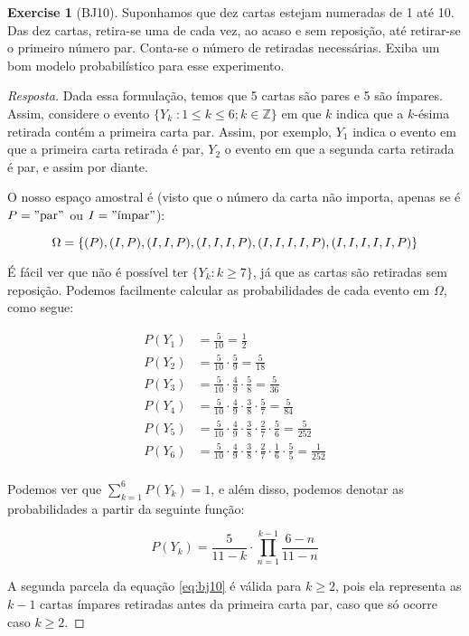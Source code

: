 \documentclass[
]{article}
\theoremstyle{definition}
\theoremstyle{definition}
\theoremstyle{definition}
\newtheorem{exercise}{Exercise}[section]
\theoremstyle{definition}
\theoremstyle{remark}
\begin{document}
\begin{exercise}[BJ10]

Suponhamos que dez cartas estejam numeradas de 1 até 10. Das dez cartas, retira-se uma de cada vez, ao acaso e sem reposição, até retirar-se o primeiro número par. Conta-se o número de retiradas necessárias. Exiba um bom modelo probabilístico para esse experimento.

\begin{proof}[Resposta]
Dada essa formulação, temos que 5 cartas são pares e 5 são ímpares. Assim, considere o evento \(\{Y_{k} \;: 1 \le k \le 6 ; k \in \mathbb{Z}\}\) em que \(k\) indica que a \(k\)-ésima retirada contém a primeira carta par. Assim, por exemplo, \(Y_{1}\) indica o evento em que a primeira carta retirada é par, \(Y_{2}\) o evento em que a segunda carta retirada é par, e assim por diante.

O nosso espaço amostral é (visto que o número da carta não importa, apenas se é \(P = "\text{par}"\) ou \(I = "\text{ímpar}"\)):

\begin{equation*}
\Omega = \{(P), (I,P), (I,I,P), (I,I,I,P), (I,I,I,I,P), (I,I,I,I,I,P)\}\\
\end{equation*}

É fácil ver que não é possível ter \(\{Y_{k} : k \ge 7\}\), já que as cartas são retiradas sem reposição. Podemos facilmente calcular as probabilidades de cada evento em \(\Omega\), como segue:

\begin{align*}
P(Y_{1}) &= \frac{5}{10} = \frac{1}{2}\\
P(Y_{2}) &= \frac{5}{10} \cdot \frac{5}{9}  = \frac{5}{18}\\
P(Y_{3}) &= \frac{5}{10} \cdot \frac{4}{9} \cdot \frac{5}{8} = \frac{5}{36}\\
P(Y_{4}) &= \frac{5}{10} \cdot \frac{4}{9} \cdot \frac{3}{8} \cdot \frac{5}{7} = \frac{5}{84}\\
P(Y_{5}) &= \frac{5}{10} \cdot \frac{4}{9} \cdot \frac{3}{8} \cdot \frac{2}{7} \cdot \frac{5}{6} = \frac{5}{252}\\
P(Y_{6}) &= \frac{5}{10} \cdot \frac{4}{9} \cdot \frac{3}{8} \cdot \frac{2}{7} \cdot \frac{1}{6} \cdot \frac{5}{5} = \frac{1}{252}\\
\end{align*}

Podemos ver que \(\sum_{k = 1}^{6}P(Y_{k}) = 1\), e além disso, podemos denotar as probabilidades a partir da seguinte função:

\begin{equation}
P(Y_{k}) = \frac{5}{11-k} \cdot \prod_{n=1}^{k-1} \frac{6-n}{11-n}
\label{eq:bj10}
\end{equation}

A segunda parcela da equação \eqref{eq:bj10} é válida para \(k \ge 2\), pois ela representa as \(k-1\) cartas ímpares retiradas antes da primeira carta par, caso que só ocorre caso \(k \ge 2\).
\end{proof}

\end{exercise}
\end{document}
